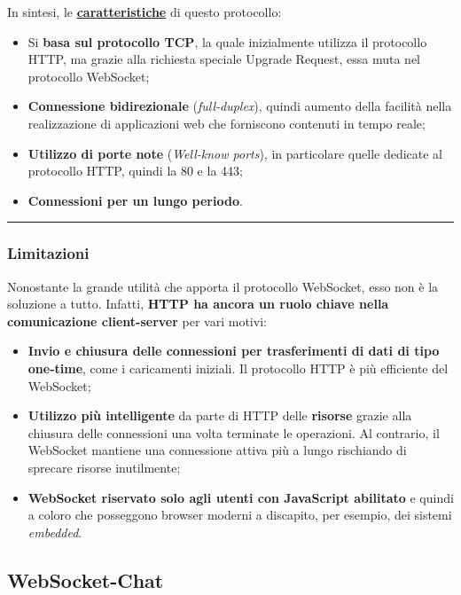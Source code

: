 \documentclass[a4paper]{article}
\newcommand{\longline}{\noindent\rule{\textwidth}{0.4pt}}
\begin{document}
	\noindent
	In sintesi, le \textbf{\underline{caratteristiche}} di questo protocollo:
	\begin{itemize}
		\item Si \textbf{basa sul protocollo TCP}, la quale inizialmente utilizza il protocollo HTTP, ma grazie alla richiesta speciale Upgrade Request, essa muta nel protocollo WebSocket;
		
		\item \textbf{Connessione bidirezionale} (\emph{full-duplex}), quindi aumento della facilità nella realizzazione di applicazioni web che forniscono contenuti in tempo reale;
		
		\item \textbf{Utilizzo di porte note} (\emph{Well-know ports}), in particolare quelle dedicate al protocollo HTTP, quindi la 80 e la 443;
		
		\item \textbf{Connessioni per un lungo periodo}.
	\end{itemize}

	\longline
	
	\subsubsection{Limitazioni}
	
	Nonostante la grande utilità che apporta il protocollo WebSocket, esso non è la soluzione a tutto. Infatti, \textbf{HTTP ha ancora un ruolo chiave nella comunicazione client-server} per vari motivi:
	\begin{itemize}
		\item \textbf{Invio e chiusura delle connessioni per trasferimenti di dati di tipo one-time}, come i caricamenti iniziali. Il protocollo HTTP è più efficiente del WebSocket;
		
		\item \textbf{Utilizzo più intelligente} da parte di HTTP delle \textbf{risorse} grazie alla chiusura delle connessioni una volta terminate le operazioni. Al contrario, il WebSocket mantiene una connessione attiva più a lungo rischiando di sprecare risorse inutilmente;
		
		\item \textbf{WebSocket riservato solo agli utenti con JavaScript abilitato} e quindi a coloro che posseggono browser moderni a discapito, per esempio, dei sistemi \emph{embedded}.
	\end{itemize}\newpage

	\subsection{WebSocket-Chat}
	
\end{document}

